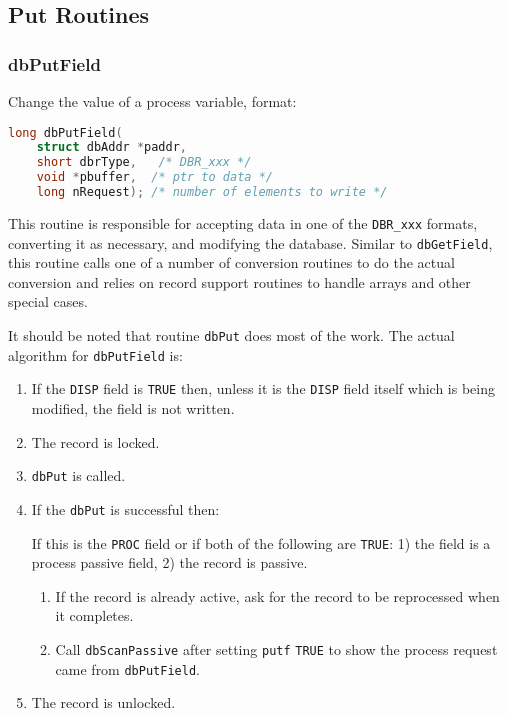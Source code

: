 \subsection{Put Routines}

\subsubsection{dbPutField}

Change the value of a process variable, format:

\begin{lstlisting}[language=C]
long dbPutField(
    struct dbAddr *paddr,
    short dbrType,   /* DBR_xxx */
    void *pbuffer,  /* ptr to data */
    long nRequest); /* number of elements to write */
\end{lstlisting}

This routine is responsible for accepting data in one of the \verb|DBR_xxx| formats, converting it as necessary, and modifying the database.
Similar to \verb|dbGetField|, this routine calls one of a number of conversion routines to do the actual conversion and relies on record support routines to handle arrays and other special cases.

It should be noted that routine \verb|dbPut| does most of the work.
The actual algorithm for \verb|dbPutField| is:

\begin{enumerate}

\item If the \verb|DISP| field is \verb|TRUE| then, unless it is the \verb|DISP| field itself which is being modified, the field is not written.

\item The record is locked.

\item \verb|dbPut| is called.

\item If the \verb|dbPut| is successful then:

If this is the \verb|PROC| field or if both of the following are \verb|TRUE|:
1) the field is a process passive field,
2) the record is passive.

\begin{enumerate}

\item If the record is already active, ask for the record to be reprocessed when it completes.

\item Call \verb|dbScanPassive| after setting \verb|putf| \verb|TRUE| to show the process request came from \verb|dbPutField|.

\end{enumerate}

\item The record is unlocked.

\end{enumerate}

